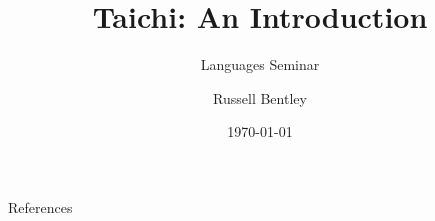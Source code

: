 \documentclass{beamer}[10pt]
\title{Taichi: An Introduction}
\subtitle{Languages Seminar}
\author{Russell Bentley}
\institute{Stony Brook}
\date{\today}
\begin{document}
\frame{\titlepage}



















\begin{frame}[allowframebreaks]{References}
    \tiny
    \printbibliography
\end{frame}
\end{document}
